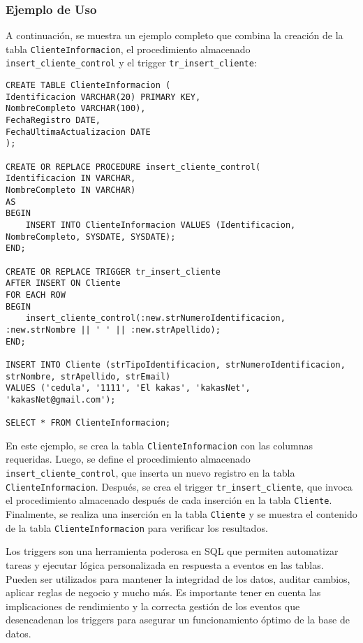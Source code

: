 \documentclass[executivepaper]{article}
\begin{document}
\subsubsection*{Ejemplo de Uso}

A continuación, se muestra un ejemplo completo que combina la creación de la tabla \texttt{ClienteInformacion}, el procedimiento almacenado \texttt{insert\_cliente\_control} y el trigger \texttt{tr\_insert\_cliente}:

\begin{lstlisting}
CREATE TABLE ClienteInformacion (
Identificacion VARCHAR(20) PRIMARY KEY,
NombreCompleto VARCHAR(100),
FechaRegistro DATE,
FechaUltimaActualizacion DATE
);

CREATE OR REPLACE PROCEDURE insert_cliente_control(
Identificacion IN VARCHAR,
NombreCompleto IN VARCHAR)
AS
BEGIN
    INSERT INTO ClienteInformacion VALUES (Identificacion, NombreCompleto, SYSDATE, SYSDATE);
END;

CREATE OR REPLACE TRIGGER tr_insert_cliente
AFTER INSERT ON Cliente
FOR EACH ROW
BEGIN
    insert_cliente_control(:new.strNumeroIdentificacion, :new.strNombre || ' ' || :new.strApellido);
END;

INSERT INTO Cliente (strTipoIdentificacion, strNumeroIdentificacion, strNombre, strApellido, strEmail)
VALUES ('cedula', '1111', 'El kakas', 'kakasNet', 'kakasNet@gmail.com');

SELECT * FROM ClienteInformacion;
\end{lstlisting}

En este ejemplo, se crea la tabla \texttt{ClienteInformacion} con las columnas requeridas. Luego, se define el procedimiento almacenado \texttt{insert\_cliente\_control}, que inserta un nuevo registro en la tabla \texttt{ClienteInformacion}. Después, se crea el trigger \texttt{tr\_insert\_cliente}, que invoca el procedimiento almacenado después de cada inserción en la tabla \texttt{Cliente}. Finalmente, se realiza una inserción en la tabla \texttt{Cliente} y se muestra el contenido de la tabla \texttt{ClienteInformacion} para verificar los resultados.

Los triggers son una herramienta poderosa en SQL que permiten automatizar tareas y ejecutar lógica personalizada en respuesta a eventos en las tablas. Pueden ser utilizados para mantener la integridad de los datos, auditar cambios, aplicar reglas de negocio y mucho más. Es importante tener en cuenta las implicaciones de rendimiento y la correcta gestión de los eventos que desencadenan los triggers para asegurar un funcionamiento óptimo de la base de datos.
\end{document}
